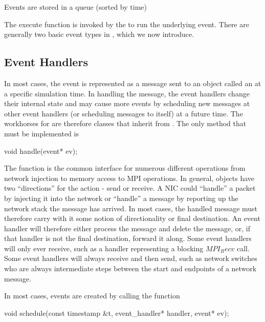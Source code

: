 Events are stored in a queue (sorted by time)

\begin{CppCode}
namespace sstmac {

class event_queue_entry
{
 public:
  virtual void
  execute() = 0;

  ...
};
\end{CppCode}

The execute function is invoked by the \evmgr to run the underlying event.
There are generally two basic event types in \sstmacro, which we now introduce.

\subsection{Event Handlers}
In most cases, the event is represented as a message sent to an object called an \evhandler at a specific simulation time.
In handling the message, the event handlers change their internal state and may cause more events
by scheduling new messages at other event handlers (or scheduling messages to itself) at a future time.
The workhorses for \sstmacro are therefore classes that inherit from \evhandler.
The only method that must be implemented is

\begin{CppCode}
void
handle(event* ev);
\end{CppCode}
The function is the common interface for numerous different operations from network injection to memory access to MPI operations.
In general, objects have two ``directions'' for the action - send or receive.
A NIC could ``handle'' a packet by injecting it into the network or ``handle'' a message by reporting up the network stack the message has arrived.
In most cases, the handled message must therefore carry with it some notion of directionality or final destination.
An event handler will therefore either process the message and delete the message, or, if that handler is not the final destination, forward it along.
Some event handlers will only ever receive, such as a handler representing a blocking $MPI_Recv$ call.
Some event handlers will always receive and then send, such as network switches who are always intermediate steps between the start and endpoints of a network message.

In most cases, events are created by calling the function

\begin{CppCode}
void
schedule(const timestamp &t,
  event_handler* handler,
  event* ev);
\end{CppCode}

